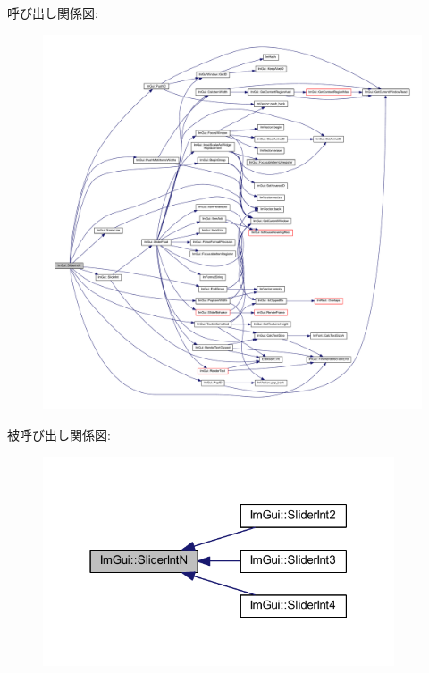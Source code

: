 呼び出し関係図\+:\nopagebreak
\begin{figure}[H]
\begin{center}
\leavevmode
\includegraphics[width=350pt]{namespace_im_gui_a13fe35db80c7d1002c98fd5e8ea90239_cgraph}
\end{center}
\end{figure}
被呼び出し関係図\+:\nopagebreak
\begin{figure}[H]
\begin{center}
\leavevmode
\includegraphics[width=295pt]{namespace_im_gui_a13fe35db80c7d1002c98fd5e8ea90239_icgraph}
\end{center}
\end{figure}
\mbox{\label{namespace_im_gui_a5b76ec69758aeb0a00a66f142f7a4fb2}} 
